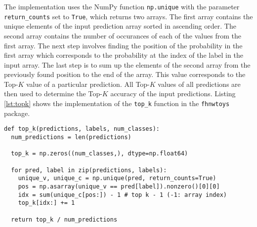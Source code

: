 The implementation uses the NumPy function \texttt{np.unique} with the parameter \texttt{return\_counts} set to \texttt{True}, which returns two arrays.
The first array contains the unique elements of the input prediction array sorted in ascending order.
The second array contains the number of occurances of each of the values from the first array.
The next step involves finding the position of the probability in the first array which corresponds to the probability at the index of the label in the input array.
The last step is to sum up the elements of the second array from the previously found position to the end of the array.
This value corresponds to the Top-$K$ value of a particular prediction.
All Top-$K$ values of all predictions are then used to determine the Top-$K$ accuracy of the input predictions.
Listing \ref{lst:topk} shows the implementation of the \texttt{top\_k} function in the \texttt{fhnwtoys} package.

\begin{lstlisting}[style=python, caption={Implementation of the Top-K function}, label=lst:topk]
def top_k(predictions, labels, num_classes):
  num_predictions = len(predictions)

  top_k = np.zeros((num_classes,), dtype=np.float64)

  for pred, label in zip(predictions, labels):
    unique_v, unique_c = np.unique(pred, return_counts=True)
    pos = np.asarray(unique_v == pred[label]).nonzero()[0][0]
    idx = sum(unique_c[pos:]) - 1 # top k - 1 (-1: array index)
    top_k[idx:] += 1

  return top_k / num_predictions
\end{lstlisting}

